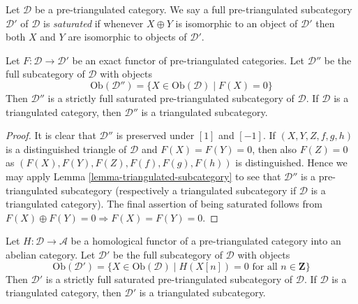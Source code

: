 \begin{definition}
\label{definition-saturated}
Let $\mathcal{D}$ be a pre-triangulated category. We say a full
pre-triangulated subcategory $\mathcal{D}'$ of $\mathcal{D}$ is
{\it saturated} if whenever $X \oplus Y$ is isomorphic to an object
of $\mathcal{D}'$ then both $X$ and $Y$ are isomorphic to objects
of $\mathcal{D}'$.
\end{definition}

\begin{lemma}
\label{lemma-triangle-functor-kernel}
Let $F : \mathcal{D} \to \mathcal{D}'$ be an exact functor of
pre-triangulated categories. Let $\mathcal{D}''$ be the full subcategory
of $\mathcal{D}$ with objects
$$
\text{Ob}(\mathcal{D}'') =
\{X \in \text{Ob}(\mathcal{D}) \mid F(X) = 0\}
$$
Then $\mathcal{D}''$ is a strictly full saturated pre-triangulated
subcategory of $\mathcal{D}$. If $\mathcal{D}$ is a triangulated category,
then $\mathcal{D}''$ is a triangulated subcategory.
\end{lemma}

\begin{proof}
It is clear that $\mathcal{D}''$ is preserved under $[1]$ and $[-1]$.
If $(X, Y, Z, f, g, h)$ is a distinguished triangle of $\mathcal{D}$
and $F(X) = F(Y) = 0$, then also $F(Z) = 0$ as
$(F(X), F(Y), F(Z), F(f), F(g), F(h))$ is distinguished.
Hence we may apply
Lemma \ref{lemma-triangulated-subcategory}
to see that $\mathcal{D}''$ is a pre-triangulated subcategory (respectively
a triangulated subcategory if $\mathcal{D}$ is a triangulated category).
The final assertion of being saturated follows from
$F(X) \oplus F(Y) = 0 \Rightarrow F(X) = F(Y) = 0$.
\end{proof}

\begin{lemma}
\label{lemma-homological-functor-kernel}
Let $H : \mathcal{D} \to \mathcal{A}$ be a homological functor of
a pre-triangulated category into an abelian category.
Let $\mathcal{D}'$ be the full subcategory of $\mathcal{D}$ with objects
$$
\text{Ob}(\mathcal{D}') =
\{X \in \text{Ob}(\mathcal{D}) \mid
H(X[n]) = 0\text{ for all }n \in \mathbf{Z}\}
$$
Then $\mathcal{D}'$ is a strictly full saturated pre-triangulated subcategory
of $\mathcal{D}$. If $\mathcal{D}$ is a triangulated category, then
$\mathcal{D}'$ is a triangulated subcategory.
\end{lemma}

